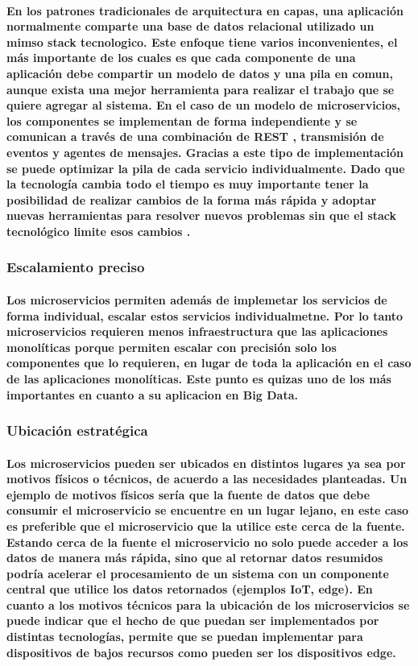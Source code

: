 \paragraph{
    En los patrones tradicionales de arquitectura en capas, una aplicación normalmente comparte una base de datos relacional utilizado un mimso stack tecnologico. Este enfoque tiene varios inconvenientes, el más importante de los cuales es que cada componente de una aplicación debe compartir un modelo de datos y una pila en comun, aunque exista una mejor herramienta para realizar el trabajo que se quiere agregar al sistema.
    En el caso de un modelo de microservicios, los componentes se implementan de forma independiente y se comunican a través de una combinación de REST \cite{RESTWikimedia2022Jan}, transmisión de eventos y agentes de mensajes. Gracias a este tipo de implementación se puede optimizar la pila de cada servicio individualmente. Dado que la tecnología cambia todo el tiempo es muy importante tener la posibilidad de realizar cambios de la forma más rápida y adoptar nuevas herramientas para resolver nuevos problemas sin que el stack tecnológico limite esos cambios \cite{ibmmicroservicios}.
}
\subsubsection{Escalamiento preciso}
\paragraph{
    Los microservicios permiten además de implemetar los servicios de forma individual, escalar estos servicios individualmetne. Por lo tanto microservicios requieren menos infraestructura que las aplicaciones monolíticas porque permiten escalar con precisión solo los componentes que lo requieren, en lugar de toda la aplicación en el caso de las aplicaciones monolíticas. Este punto es quizas uno de los más importantes en cuanto a su aplicacion en Big Data.
}
\subsubsection{Ubicación estratégica}
\paragraph{
    Los microservicios pueden ser ubicados en distintos lugares ya sea por motivos físicos o técnicos, de acuerdo a las necesidades planteadas. Un ejemplo de motivos físicos sería que la fuente de datos que debe consumir el microservicio se encuentre en un lugar lejano, en este caso es preferible que el microservicio que la utilice este cerca de la fuente. Estando cerca de la fuente el microservicio no solo puede acceder a los datos de manera más rápida, sino que al retornar datos resumidos podría acelerar el procesamiento de un sistema con un componente central que utilice los datos retornados (ejemplos IoT, edge). En cuanto a los motivos técnicos para la ubicación de los microservicios se puede indicar que el hecho de que puedan ser implementados por distintas tecnologías, permite que se puedan implementar para dispositivos de bajos recursos como pueden ser los dispositivos edge.
}


